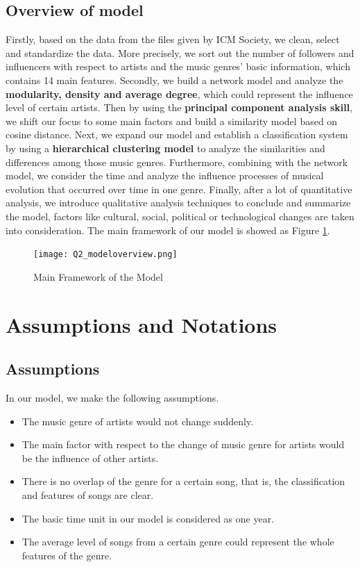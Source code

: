 \documentclass[12pt]{article}
\begin{document}
\subsection{Overview of model}
Firstly, based on the data from the files given by ICM Society, we clean, select and standardize the data. More precisely, we sort out the number of followers and influencers with respect to artists and the music genres' basic information, which contains 14 main features. Secondly, we build a network model and analyze the \textbf{modularity, density and average degree}, which could represent the influence level of certain artists. Then by using the \textbf{principal component analysis skill}, we shift our focus to some main factors and build a similarity model based on cosine distance. Next, we expand our model and establish a classification system by using a \textbf{hierarchical clustering model} to analyze the similarities and differences among those music genres. Furthermore, combining with the network model, we consider the time and analyze the influence processes of musical evolution that occurred over time in one genre. Finally, after a lot of quantitative analysis, we introduce qualitative analysis techniques to conclude and summarize the model, factors like cultural, social, political or technological changes are taken into consideration.
The main framework of our model is showed as Figure \ref{overview}.
\begin{figure}[H]
\label{fig:aa}
\small
\centering
\texttt{[image: Q2\_modeloverview.png]}
\caption{Main Framework of the Model}
\label{overview}
\end{figure}



\section{Assumptions and Notations}

\subsection{Assumptions}
In our model, we make the following assumptions.
\begin{itemize}
    \item The music genre of artists would not change suddenly.
    \item The main factor with respect to the change of music genre for artists would be the influence of other artists.
    \item There is no overlap of the genre for a certain song, that is, the classification and features of songs are clear.
    \item The basic time unit in our model is considered as one year.
    \item The average level of songs from a certain genre could represent the whole features of the genre.
\end{itemize}
\end{document}
